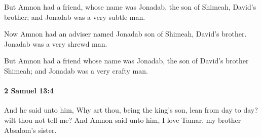 			\begin{versebox}
					\item[BHS] 
					\item[ASV] But Amnon had a friend, whose name was Jonadab, the son of Shimeah, David's brother; and Jonadab was a very subtle man.
					\item[NIV] Now Amnon had an adviser named Jonadab son of Shimeah, David’s brother. Jonadab was a very shrewd man.
					\item[NRSV] But Amnon had a friend whose name was Jonadab, the son of David’s brother Shimeah; and Jonadab was a very crafty man.
			\end{versebox}

		\paragraph{2 Samuel 13:4} %
			\label{2SAMUEL-13-4}

			And he said unto him, Why art thou, being the king’s son, lean from day to day? wilt thou not tell me? And Amnon said unto him, I love Tamar, my brother Absalom’s sister.

